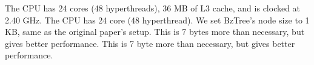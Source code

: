 The CPU has 24 cores (48 hyperthreads), 36 MB of L3 cache, and is clocked at 2.40 GHz.
The CPU has 24 core (48 hyperthread).
We set BzTree’s node size to 1 KB, same as the original paper’s setup. 
This is 7 bytes more than necessary, but gives better performance. 
This is 7 byte more than necessary, but gives better performance. 